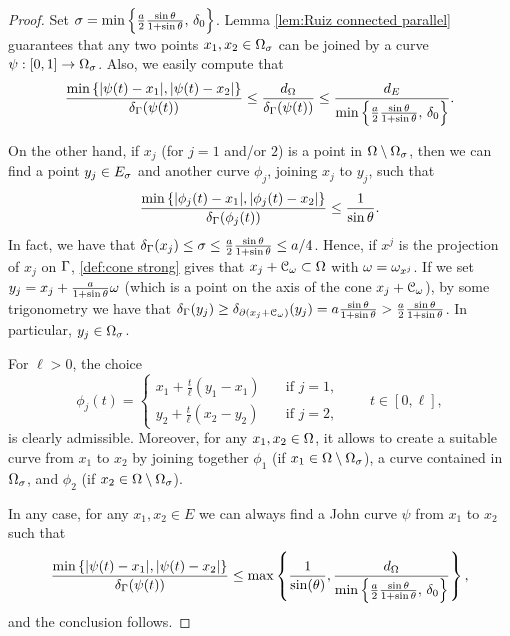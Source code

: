 \documentclass[a4paper,10pt]{amsart}
\numberwithin{equation}{section}
\begin{document}
\begin{proof}
	Set $\sigma= \min \left\{ \frac{a}{2} \frac{\sin \theta}{1+ \sin \theta} , \, \delta_0 \right\}$. Lemma \ref{lem:Ruiz connected parallel} guarantees that any two points $x_1, x_2\in\Omega_\sigma$ can be joined by a curve $\psi: [0,1]\to\Omega_\sigma$. Also, we easily compute that 
	$$
	\frac{\min\left\{ |\psi(t) - x_1|, |\psi(t) - x_2| \right\}}{\delta_{\Gamma} (\psi(t))} \le 
	\frac{d_\Omega}{\delta_{\Gamma} (\psi(t))} \le \frac{d_E}{\min \left\{ \frac{a}{2} \frac{\sin \theta}{1+ \sin \theta} , \, \delta_0 \right\} } . 
	$$
	
	On the other hand, if $x_j$ (for $j=1$ and/or $2$) is a point in $\Omega\setminus \Omega_\sigma$, then we can find a point $y_j \in E_\sigma$ and another curve $\phi_j$, joining $x_j$ to $y_j$,  such that
\begin{equation*}
\label{eq:stepJohnstimaesplicita}
		\frac{\min\left\{ |\phi_j (t) - x_1|, |\phi_j (t) - x_2| \right\}}{\delta_{\Gamma} (\phi_j (t))} \le
\frac{1}{\sin \theta} .
\end{equation*}
In fact, we have that
	$\delta_{\Gamma} (x_j) \le \sigma \le \frac{a}{2} \frac{\sin \theta}{1+ \sin \theta} \le a/4 $. Hence, if $x^j$ is the projection of $x_j$ on $\Gamma$, \eqref{def:cone strong} gives that $x_j + \mathcal{C}_{\omega} \subset \Omega$ with $\omega=\omega_{x^j}$. If we set $y_j = x_j + \frac{a}{1+ \sin \theta} \omega$ (which is a point on the axis of the cone $x_j + \mathcal{C}_{\omega}$), by some trigonometry we have that $\delta_{\Gamma} (y_j) \ge \delta_{\partial (x_j + \mathcal{C}_\omega)}(y_j) = a \frac{\sin \theta}{ 1 +\sin \theta} > \frac{a}{2} \frac{\sin \theta}{ 1 +\sin \theta}$. In particular, $y_j \in \Omega_\sigma$. 
\par
For $\ell>0$, the choice
	\begin{equation*}
		\phi_j(t)=
		\begin{cases}
			x_1 + \frac{t}{\ell} (y_1 - x_1) \quad & \text{if } j=1 , 
			\\
			y_2 + \frac{t}{\ell} (x_2 - y_2) \quad & \text{if } j=2 ,
		\end{cases}
		\quad \quad
		t \in [0, \ell],
	\end{equation*}
is clearly admissible. Moreover, for any $x_1, x_2 \in \Omega$, it allows to create a suitable curve from $x_1$ to $x_2$  by joining together $\phi_1$ (if $x_1 \in \Omega\setminus \Omega_\sigma$), a curve contained in $\Omega_\sigma$, and $\phi_2$ (if $x_2 \in \Omega\setminus \Omega_\sigma$).  
	
	
	
	In any case, for any $x_1, x_2 \in E$ we can always find a John curve $\psi$ from $x_1$ to $x_2$ such that
	\begin{equation*}
		\frac{\min\left\{ |\psi(t) - x_1|, |\psi(t) - x_2| \right\}}{\delta_{\Gamma} (\psi(t))} 
		\le \max \left\{ \frac{1}{\sin(\theta)} , \frac{d_\Omega}{\min \left\{ \frac{a}{2} \frac{\sin \theta}{1+ \sin \theta} , \, \delta_0 \right\} } \right\} ,
	\end{equation*}
	and the conclusion follows.
\end{proof}
\end{document}
